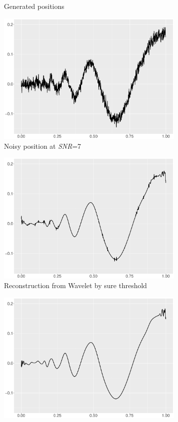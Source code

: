 \begin{figure}
\begin{subfigure}{0.45\textwidth}
    \caption{Generated positions}
    \end{subfigure}
    \begin{subfigure}{0.45\textwidth}
    \centering
    \includegraphics[width=\linewidth,height=0.45\textwidth]{Chapters/02TractorSplineTheory/plot/ggplot/ggDopplerPositionNoise.pdf}
    \caption{Noisy position at \textit{SNR}=7}
    \end{subfigure}
    \begin{subfigure}{0.45\textwidth}
    \centering
    \includegraphics[width=\linewidth,height=0.45\textwidth]{Chapters/02TractorSplineTheory/plot/ggplot/ggDopplerSure.pdf}
    \caption{Reconstruction from Wavelet by sure threshold}
    \end{subfigure}
    \begin{subfigure}{0.45\textwidth}
    \centering
    \includegraphics[width=\linewidth,height=0.45\textwidth]{Chapters/02TractorSplineTheory/plot/ggplot/ggDopplerBayes.pdf}

\end{subfigure}
\end{figure}

